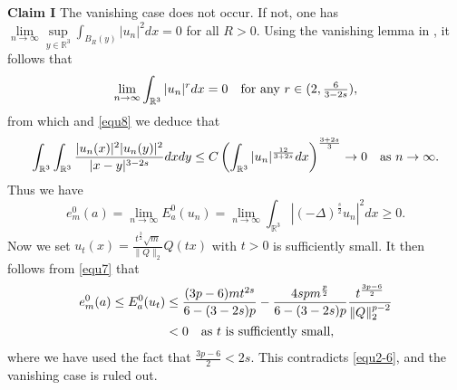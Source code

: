 \documentclass[reqno, 11pt]{amsart} %
\numberwithin{equation}{section}
\begin{document}
	\noindent
	{\bf  Claim I} The vanishing case does not occur. If not, one has $\lim\limits_{n\rightarrow\infty}\sup\limits_{y\in \mathbb{R}^{3}}\int_{B_{R}(y)}|u_{n}|^{2}dx=0$ for all $R>0$. Using the vanishing lemma in \cite{S}, it follows that
	\begin{equation*}
		\lim_{n\rightarrow\infty}\int_{\mathbb{R}^{3}}|u_{n}|^{r}dx=0\quad \hbox{for any $r\in (2, \frac{6}{3-2s})$},
	\end{equation*}
	from which and \eqref{equ8} we deduce that
	\begin{equation*}
		\int_{\mathbb{R}^{3}}\int_{\mathbb{R}^{3}}\frac{|u_{n}(x)|^{2}|u_{n}(y)|^{2}}{|x-y|^{3-2s}}dxdy\leq C\left(\int_{\mathbb{R}^{3}}|u_{n}|^{\frac{12}{3+2s}}dx\right)^{\frac{3+2s}{3}}\rightarrow0\quad \hbox{as $n\rightarrow\infty$}.
	\end{equation*}
	Thus we have
	\begin{equation}\label{equ2-6}
		e^{0}_{m}(a)=\lim _{n\rightarrow\infty}E^{0}_{a}(u_{n})=\lim _{n\rightarrow\infty}\int_{\mathbb{R}^{3}}|(-\Delta)^{\frac{s}{2}} u_{n}|^{2}dx\geq0.
	\end{equation} 
	Now we set $u_{t}(x)=\frac{t^{\frac{3}{2}}\sqrt{m}}{\|Q\|_{2}}Q(tx)$ with $t>0$ is sufficiently small. It then follows from \eqref{equ7} that
	\begin{equation}\label{equ2-7}
		\begin{split}
			e^{0}_{m}(a)\leq E^{0}_{a}(u_{t})&\leq\frac{(3p-6)mt^{2s}}{6-(3-2s)p}-\frac{4spm^{\frac{p}{2}}}{6-(3-2s)p}\frac{t^{\frac{3p-6}{2}}}{\|Q\|_{2}^{p-2}}\\
			&<0\quad \hbox{as $t$ is sufficiently small},
		\end{split}
	\end{equation}
	where we have used the fact that $\frac{3p-6}{2}<2s$. This contradicts \eqref{equ2-6}, and the vanishing case is ruled out.
	
\end{document}
